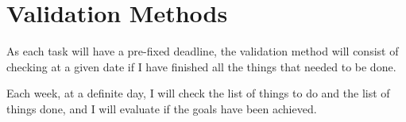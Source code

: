 \documentclass[a4paper]{article}
\begin{document}
    \section{Validation Methods}
    As each task will have a pre-fixed deadline, the validation method will consist of checking at a given date if I have finished all the things that needed to be done.

    Each week, at a definite day, I will check the list of things to do and the list of things done, and I will evaluate if the goals have been achieved.




\printbibliography
\end{document}
